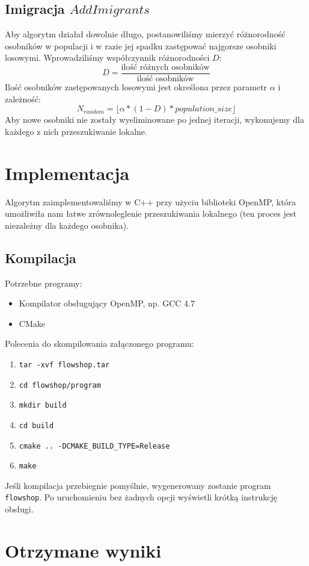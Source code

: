 \documentclass[11pt, a4wide]{article}
\begin{document}
\subsection{Imigracja $AddImigrants$}
Aby algorytm działał dowolnie długo, postanowiliśmy mierzyć różnorodność osobników w populacji i w razie jej
spadku zastępować najgorsze osobniki losowymi. Wprowadziliśmy współczynnik różnorodności $D$:
$$ D = \frac{\text{ilość różnych osobników}}{\text{ilość osobników}} $$
Ilość osobników zastępowanych losowymi jest określona przez parametr $\alpha$ i zależność:
$$ N_{random} = \lfloor \alpha * (1 - D) * population\_size  \rfloor $$
Aby nowe osobniki nie zostały wyeliminowane po jednej iteracji, wykonujemy dla każdego z nich przeszukiwanie
lokalne.




\section{Implementacja}
Algorytm zaimplementowaliśmy w C++ przy użyciu biblioteki OpenMP, która umożliwiła nam łatwe zrównoleglenie
przeszukiwania lokalnego (ten proces jest niezależny dla każdego osobnika).

\subsection{Kompilacja}
Potrzebne programy:
\begin{itemize}
  \item Kompilator obsługujący OpenMP, np. GCC 4.7
  \item CMake
\end{itemize}
Polecenia do skompilowania załączonego programu:
\begin{enumerate}
  \item \verb|tar -xvf flowshop.tar|
  \item \verb|cd flowshop/program|
  \item \verb|mkdir build|
  \item \verb|cd build|
  \item \verb|cmake .. -DCMAKE_BUILD_TYPE=Release|
  \item \verb|make|
\end{enumerate}
Jeśli kompilacja przebiegnie pomyślnie, wygenerowany zostanie program \verb|flowshop|. Po uruchomieniu
bez żadnych opcji wyświetli krótką instrukcję obsługi.



\section{Otrzymane wyniki}
\end{document}

